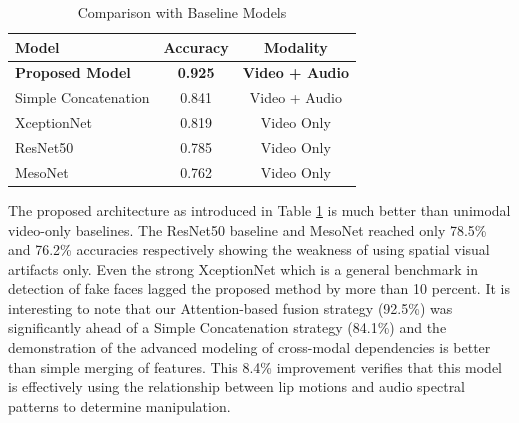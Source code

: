 \documentclass[conference]{IEEEtran}
\begin{document}

\begin{table}[!t]
\caption{Comparison with Baseline Models}
\centering
\small
\begin{tabular}{l c c}
\toprule
\textbf{Model} & \textbf{Accuracy} & \textbf{Modality} \\
\midrule
\textbf{Proposed Model} & \textbf{0.925} & \textbf{Video + Audio} \\
Simple Concatenation & 0.841 & Video + Audio \\
XceptionNet & 0.819 & Video Only \\
ResNet50 & 0.785 & Video Only \\
MesoNet & 0.762 & Video Only \\
\bottomrule
\end{tabular}
\label{table:comparative_performance}
\end{table}


The proposed architecture as introduced in Table \ref{table:comparative_performance} is much better than unimodal video-only baselines. The ResNet50 baseline and MesoNet reached only 78.5\% and 76.2\% accuracies respectively showing the weakness of using spatial visual artifacts only. Even the strong XceptionNet which is a general benchmark in detection of fake faces lagged the proposed method by more than 10 percent. It is interesting to note that our Attention-based fusion strategy (92.5\%) was significantly ahead of a Simple Concatenation strategy (84.1\%) and the demonstration of the advanced modeling of cross-modal dependencies is better than simple merging of features. This 8.4\% improvement verifies that this model is effectively using the relationship between lip motions and audio spectral patterns to determine manipulation.
\end{document}
